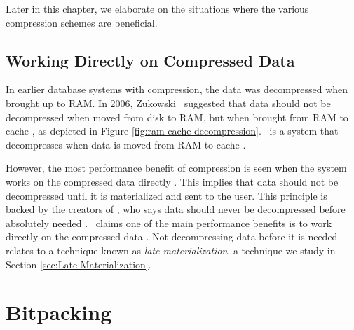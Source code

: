 Later in this chapter, we elaborate on the situations where the various compression schemes are beneficial.

\subsection{Working Directly on Compressed Data}
\label{sub:Working Directly on Compressed Data}


In earlier database systems with compression, the data was decompressed when brought up to RAM. In 2006, Zukowski \ea~suggested that data should not be decompressed when moved from disk to RAM, but when brought from RAM to cache \cite{Zukowski2006-oz}, as depicted in Figure \ref{fig:ram-cache-decompression}. \monetx~is a system that decompresses when data is moved from RAM to cache \cite{Johnson2008-cp}.

However, the most performance benefit of compression is seen when the system works on the compressed data directly \cite{Lemke2010-is}. This implies that data should not be decompressed until it is materialized and sent to the user. This principle is backed by the creators of \blink, who says data should never be decompressed before absolutely needed \cite{Barber2012-xt}. \oracle~claims one of the main performance benefits is to work directly on the compressed data \cite{Oracle2015-fs}. Not decompressing data before it is needed relates to a technique known as \textit{late materialization}, a technique we study in Section \ref{sec:Late Materialization}.


\section{Bitpacking}
\label{sec:Bitpacking}


